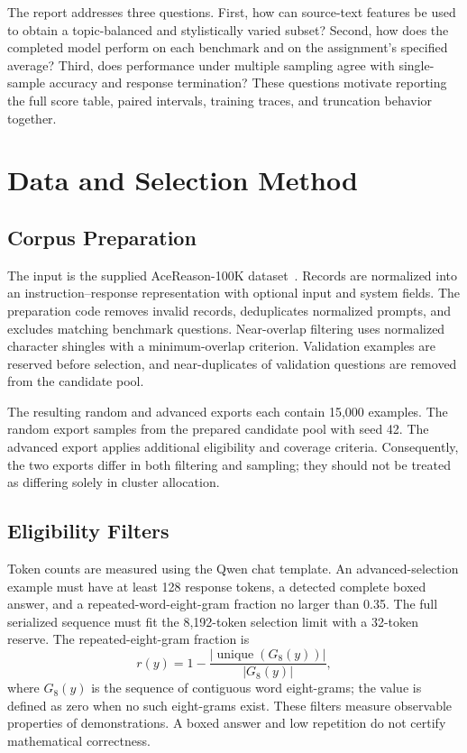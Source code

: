 \documentclass[11pt,letterpaper]{article}
\begin{document}
The report addresses three questions. First, how can source-text features be used to obtain a topic-balanced and stylistically varied subset? Second, how does the completed model perform on each benchmark and on the assignment's specified average? Third, does performance under multiple sampling agree with single-sample accuracy and response termination? These questions motivate reporting the full score table, paired intervals, training traces, and truncation behavior together.

\section{Data and Selection Method}
\subsection{Corpus Preparation}
The input is the supplied AceReason-100K dataset~\cite{acereason}. Records are normalized into an instruction--response representation with optional input and system fields. The preparation code removes invalid records, deduplicates normalized prompts, and excludes matching benchmark questions. Near-overlap filtering uses normalized character shingles with a minimum-overlap criterion. Validation examples are reserved before selection, and near-duplicates of validation questions are removed from the candidate pool.

The resulting random and advanced exports each contain 15,000 examples. The random export samples from the prepared candidate pool with seed 42. The advanced export applies additional eligibility and coverage criteria. Consequently, the two exports differ in both filtering and sampling; they should not be treated as differing solely in cluster allocation.

\subsection{Eligibility Filters}
Token counts are measured using the Qwen chat template. An advanced-selection example must have at least 128 response tokens, a detected complete boxed answer, and a repeated-word-eight-gram fraction no larger than 0.35. The full serialized sequence must fit the 8,192-token selection limit with a 32-token reserve. The repeated-eight-gram fraction is
\begin{equation}
 r(y)=1-\frac{|\operatorname{unique}(G_8(y))|}{|G_8(y)|},
\end{equation}
where $G_8(y)$ is the sequence of contiguous word eight-grams; the value is defined as zero when no such eight-grams exist. These filters measure observable properties of demonstrations. A boxed answer and low repetition do not certify mathematical correctness.
\end{document}
